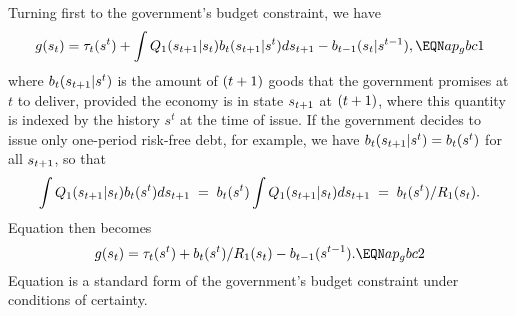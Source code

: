Turning first to the government's budget constraint, we have
$$g(s_t)=\tau_t(s^t)+\int Q_1(s_{\tone}|s_t) b_t(s_{\tone}| s^t) ds_{\tone}
-b_{t-1}(s_t|s^{t-1}),                                               \EQN ap_gbc1 $$
where $b_t(s_{{t+1}}|s^t)$ is the amount of $({t+1})$ goods that the government
promises at $t$ to deliver, provided the economy is in state $s_{{t+1}}$ at
$({t+1})$, where this quantity is indexed by the history $s^t$ at the
time of issue.  If the government decides to issue only one-period risk-free
debt, for example, we have $b_t(s_{{t+1}}|s^t)=b_t(s^t)$ for all $s_{{t+1}}$, so
that
$$ \int Q_1(s_{{t+1}}| s_t) b_t(s^t) ds_{{t+1}} \;=\; b_t(s^t) \int
Q_1(s_{{t+1}}|s_t) ds_{{t+1}} \;=\; b_t(s^t)/R_{1}(s_t).$$
Equation  then becomes
$$g(s_t)=\tau_t(s^t) +b_t(s^t) /R_{1}(s_t)-b_{t-1}(s^{t-1 }).       \EQN ap_gbc2   $$
Equation  is a standard form of the government's budget constraint
under conditions of certainty.



